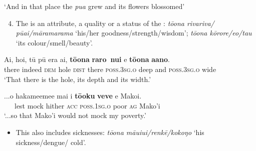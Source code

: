 \glt
‘And in that place the \textit{pua} grew and its flowers blossomed’ \textstyleExampleref{[R532-07.081]}
\z

\begin{enumerate}
\setcounter{enumi}{3} 
\item 
The  is an attribute, a quality or a status of the : \textit{tō{\ꞌ}ona rivariva/ pūai/māramarama} ‘his/her goodness/\textit{}strength/\textit{}wisdom’; \textit{tō{\ꞌ}ona kōrore/{\ꞌ}eo/tau} ‘its colour/smell/beauty’.

\end{enumerate}

\ea\label{ex:6.82}
\gll {\ꞌ}Ai, ho{\ꞌ}i, tū pū era {\ꞌ}ai, \textbf{tō{\ꞌ}ona} \textbf{raro~nui} {\ꞌ}e \textbf{tō{\ꞌ}ona} \textbf{{\ꞌ}a{\ꞌ}ano}. \\
there indeed \textsc{dem} hole \textsc{dist} there \textsc{poss.3sg.o} deep and \textsc{poss.3sg.o} wide \\

\glt 
‘That there is the hole, its depth and its width.’ \textstyleExampleref{[R620.095]} 
\z

\ea\label{ex:6.83}
\gll ...{\ꞌ}o hakame{\ꞌ}eme{\ꞌ}e mai i \textbf{tō{\ꞌ}oku} \textbf{veve} e Mako{\ꞌ}i. \\
~~~lest mock hither \textsc{acc} \textsc{poss.1sg.o} poor \textsc{ag} Mako’i \\

\glt
‘...so that Mako’i would not mock my poverty.’ \textstyleExampleref{[R214.050]} 
\z

\begin{itemize}
\item[]
This also includes sicknesses: \textit{tō{\ꞌ}ona māuiui/renkē/kokoŋo} ‘his sickness/\textit{}dengue/ cold’.
\end{itemize}

